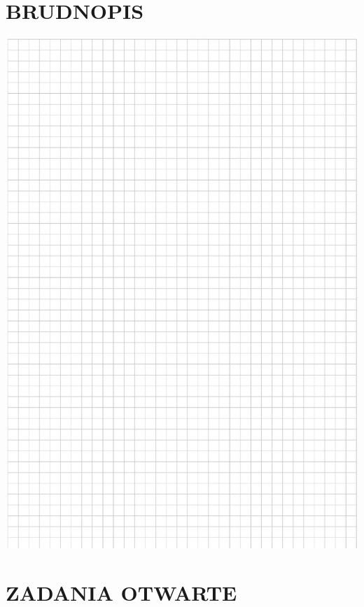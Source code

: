 \documentclass[10pt]{article}
\begin{document}
\section*{BRUDNOPIS}
\begin{center}
\includegraphics[max width=\textwidth]{2024_11_21_ad52a81220b9b2239458g-09}
\end{center}

\section*{ZADANIA OTWARTE}
\end{document}
